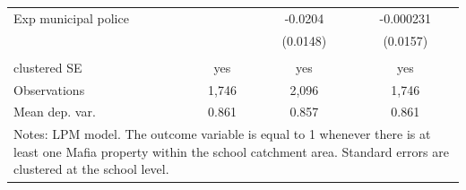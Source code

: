 \documentclass[12pt]{article}
\theoremstyle{plain}
\theoremstyle{plain}
\theoremstyle{plain}
\theoremstyle{definition}
\theoremstyle{plain}
\theoremstyle{definition}
\theoremstyle{plain}
\theoremstyle{remark}
\theoremstyle{definition}
\theoremstyle{definition}
\theoremstyle{plain}
\begin{document}
\begin{table}[H]
{\begin{tabular}{p{9.28em}lll}
    \multicolumn{1}{l}{Exp municipal police} & \multicolumn{1}{c}{} & \multicolumn{1}{c}{-0.0204} & \multicolumn{1}{c}{-0.000231} \\
    \multicolumn{1}{l}{} & \multicolumn{1}{c}{} & \multicolumn{1}{c}{(0.0148)} & \multicolumn{1}{c}{(0.0157)} \\
    \multicolumn{1}{l}{} & \multicolumn{1}{c}{} & \multicolumn{1}{c}{} & \multicolumn{1}{c}{} \\
    \multicolumn{1}{l}{clustered SE} & \multicolumn{1}{c}{yes} & \multicolumn{1}{c}{yes} & \multicolumn{1}{c}{yes} \\
    \multicolumn{1}{l}{Observations} & \multicolumn{1}{c}{1,746} & \multicolumn{1}{c}{2,096} & \multicolumn{1}{c}{1,746} \\
    \multicolumn{1}{l}{Mean dep. var.} & \multicolumn{1}{c}{0.861} & \multicolumn{1}{c}{0.857} & \multicolumn{1}{c}{0.861} \\
    \midrule
    \multicolumn{4}{p{24.28em}}{Notes: LPM model. The outcome variable is equal to 1 whenever there is at least one Mafia property within the school catchment area. Standard errors are clustered at the school level.} \\
    \end{tabular}%
    }
    \end{table}
\end{document}
